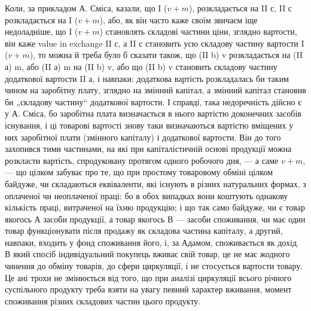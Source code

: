 Коли, за прикладом А. Сміса, казали, що I ($v + m$), розкладається на
II с, II с розкладається на I ($v + m$), або, як він часто каже своїм
звичаєм іще недоладніше, що I ($v + m$) становлять складові частини ціни,
зглядно вартости, він каже value in exchange II с, а II с становить усю
складову частину вартости I ($v + m$), то можна й треба було б сказати
також, що (II b) v розкладається на (II а) m, або (II а) m на (II b) v,
або що (II b) v становить складову частину додаткової вартости II а, і
навпаки: додаткова вартість розкладалась би таким чином на заробітну
плату, зглядно на змінний капітал, а змінний капітал становив би „складову
частину“ додаткової вартости. І справді, така недоречність дійсно
є у А. Сміса, бо заробітна плата визначається в нього вартістю доконечних
засобів існування, і ці товарові вартості знову таки визначаються
вартістю вміщених у них заробітної плати (змінного капіталу) і додаткової
вартости. Він до того захопився тими частинами, на які при капіталістичній
основі продукції можна розкласти вартість, спродуковану протягом
одного робочого дня, — а саме $v + m$, — що цілком забуває про те, що при
простому товаровому обміні цілком байдуже, чи складаються еквіваленти,
які існують в різних натуральних формах, з оплаченої чи неоплаченої праці:
бо в обох випадках вони коштують однакову кількість праці, витраченої
на їхню продукцію; і що так само байдуже, чи є товар якогось А засоби
продукції, а товар якогось В — засоби споживання, чи має один
товар функціонувати після продажу як складова частина капіталу, а
другий, навпаки, входить у фонд споживання його, і, за Адамом, споживається
як дохід. В який спосіб індивідуальний покупець вживає свій
товар, це не має жодного чинення до обміну товарів, до сфери циркуляції,
і не стосується вартости товару. Це ані трохи не змінюється
від того, що при аналізі циркуляції всього річного суспільного продукту
треба взяти на увагу певний характер вживання, момент споживання
різних складових частин цього продукту.

